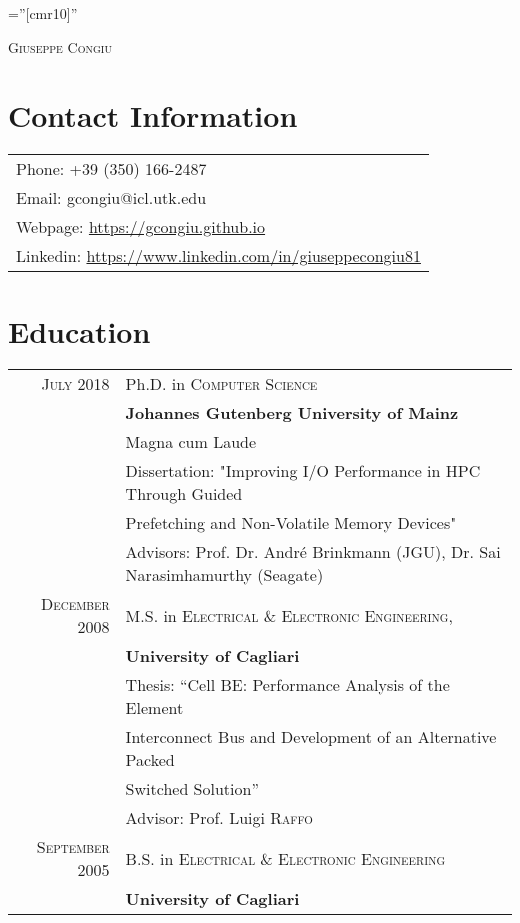 \documentclass[a4paper,10pt]{article}
\begin{document}
\pagestyle{empty} %

\font\fb=''[cmr10]'' %

\par{\centering
    {\Huge \textsc{Giuseppe Congiu}
}\bigskip\par}

\section{Contact Information}

\begin{tabular}{l}
    Phone: +39 (350) 166-2487 \\
    Email: gcongiu@icl.utk.edu \\
    Webpage: \url{https://gcongiu.github.io} \\
    Linkedin: \url{https://www.linkedin.com/in/giuseppecongiu81}
\end{tabular}

\section{Education}
\begin{tabular}{rp{11cm}}
\textsc{July 2018} & Ph.D. in \textsc{Computer Science}\\
          & \textbf{Johannes Gutenberg University of Mainz} \\
          & Magna cum Laude \\
          & Dissertation: "Improving I/O Performance in HPC Through Guided\\
          & Prefetching and Non-Volatile Memory Devices"\\
          & \small Advisors: Prof. Dr. Andr\'e Brinkmann (JGU), Dr. Sai Narasimhamurthy (Seagate)\\

\textsc{December} 2008 & M.S. in \textsc{Electrical \& Electronic Engineering}, \\
              & \textbf{University of Cagliari}\\
              & Thesis: ``Cell BE: Performance Analysis of the Element\\
              & Interconnect Bus and Development of an Alternative Packed\\
              & Switched Solution'' \\
              & \small Advisor: Prof. Luigi \textsc{Raffo}\\

\textsc{September} 2005 & B.S. in \textsc{Electrical \& Electronic Engineering} \\
               & \textbf{University of Cagliari}\\
\end{tabular}
\end{document}

